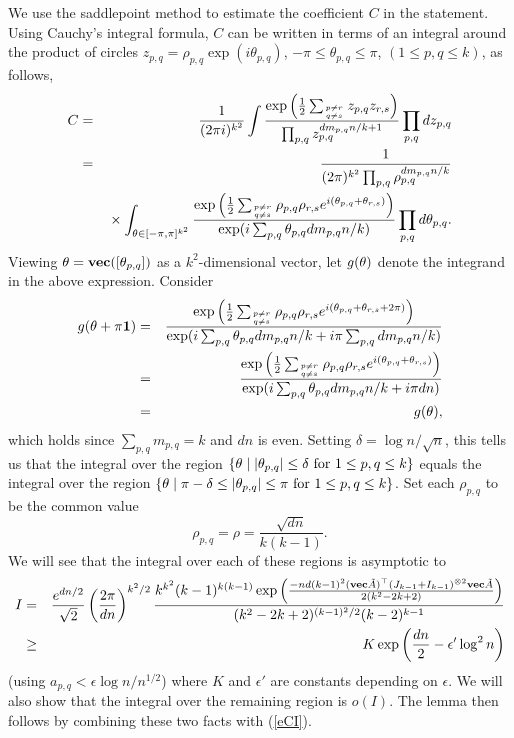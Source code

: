 \documentclass[12pt]{article}
\newcommand{\lab}[1]{\label{#1}}
\newcommand{\proofof}[1]{\par\noindent{\bf Proof of #1.\enspace}\rm}
\newcommand{\eqn}[1]{(\ref{#1})}
\def\transpose{\top}
\def\mvec{{\bf vec}}
\def\onesvec{{\mathbf{1}}}
\def\vtheta{{\bf \theta}}
\begin{document}
\proofof{Lemma~\ref{lem:saddle}}
We use the saddlepoint method to estimate the coefficient $C$ in the statement.
Using Cauchy's integral formula, $C$ can
be written in terms of an integral around the product of circles
$z_{p,q}=\rho_{p,q}\exp(i\theta_{p,q})$, $-\pi \le \theta_{p,q}\le \pi$, $(1\le p,q \le k)$, as follows,
\begin{eqnarray}
C &=&\frac{1}{(2\pi i)^{k^2}} \int \frac{     
\exp\left(\frac{1}{2}
\sum_{p\ne r \atop q\ne s}
z_{p,q}z_{r,s}\right)
}{\prod_{p,q} z_{p,q}^{dm_{p,q}n/k+1}}\prod_{p,q}dz_{p,q}\nonumber \\
&=& \frac{1}{(2\pi)^{k^2}\prod_{p,q}\rho_{p,q}^{dm_{p,q}n/k}} \nonumber\\
&&{}\times\int_{\vtheta\in [-\pi,\pi]^{k^2}}
\frac{\exp\left(\frac{1}{2}
\sum_{p\ne r \atop q\ne s}
\rho_{p,q}\rho_{r,s} e^{i(\theta_{p,q}+\theta_{r,s})}\right)
}{\exp(i\sum_{p,q}\theta_{p,q}dm_{p,q}n/k)}
\prod_{p,q}d\theta_{p,q}\lab{eCI}.
\end{eqnarray}
Viewing $\vtheta = \mvec([\theta_{p,q}])$ as a $k^2$-dimensional vector,
let $g(\vtheta)$ denote the integrand in the above expression. Consider
\begin{eqnarray*}
g(\vtheta+\pi\onesvec)
&=&
\frac{\exp\left(\frac{1}{2}
\sum_{p\ne r \atop q\ne s}
\rho_{p,q}\rho_{r,s} e^{i(\theta_{p,q}+\theta_{r,s}+2\pi)}\right)
}{\exp(i\sum_{p,q}\theta_{p,q}dm_{p,q}n/k+ i\pi\sum_{p,q}dm_{p,q}n/k )}\\
&=&
\frac{\exp\left(\frac{1}{2}
\sum_{p\ne r \atop q\ne s}
\rho_{p,q}\rho_{r,s} e^{i(\theta_{p,q}+\theta_{r,s})}\right)
}{\exp(i\sum_{p,q}\theta_{p,q}dm_{p,q}n/k+ i\pi dn )}\\
&=&
g(\vtheta),
\end{eqnarray*}
which holds since $\sum_{p,q}m_{p,q}=k$ and $dn$ is even.
Setting $\delta=\log n / \sqrt{n}$, this tells us that the integral over the
region 
$\{\vtheta \mid |\theta_{p,q}|\le\delta \mbox{ for } 1\le p,q\le k \}$ equals the integral over the region
$\{\vtheta \mid \pi-\delta \le |\theta_{p,q}|\le\pi \mbox{ for } 1\le p,q\le k\}$.
Set each $\rho_{p,q}$ to be the common value
\[
\rho_{p,q} = \rho = \frac{\sqrt{dn}}{k(k-1)}.
\]
We will see that the integral over each of these regions is asymptotic to
\begin{eqnarray}
I &=&
\frac{e^{dn/2}}{\sqrt{2}}
\left(\frac{2\pi}{dn}\right)^{k^2/2}
\frac{ 
k^{k^2}(k-1)^{k(k-1)}
\exp\left( 
\frac{-nd(k-1)^2 
(\mvec \tilde A)^\transpose (J_{k-1}+I_{k-1})^{\otimes 2} \mvec \tilde A
}{2(k^2-2k+2)}
\right) }
{ (k^2-2k+2)^{(k-1)^2/2}
(k-2)^{k-1} } \notag\\
&\ge&
K\exp\left(\frac{dn}{2}-\epsilon'\log^2 n\right)
\label{eq:I}
\end{eqnarray}
(using $a_{p,q} < \epsilon\log n/n^{1/2}$) where $K$ and $\epsilon'$ are constants depending on $\epsilon$.
We will also show that the integral over the remaining region 
is $o(I)$. The lemma then follows by combining these two facts 
with \eqn{eCI}.
\end{document}
